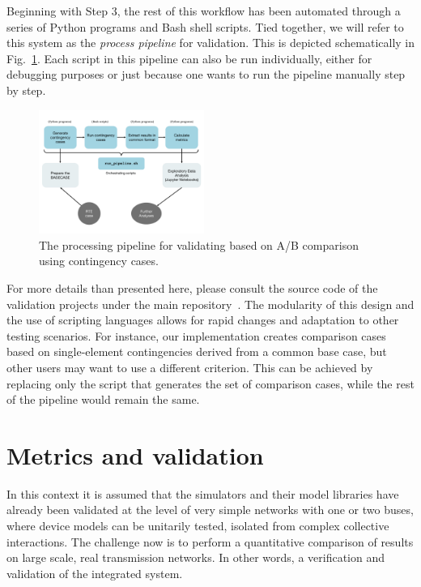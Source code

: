 \documentclass[conference]{IEEEtran}
\begin{document}
Beginning with Step 3, the rest of this workflow has been automated through a
series of Python programs and Bash shell scripts. Tied together, we will refer
to this system as the \emph{process pipeline} for validation. This is depicted
schematically in Fig.~\ref{fig:pipeline1}. Each script in this pipeline can
also be run individually, either for debugging purposes or just because one
wants to run the pipeline manually step by step.

\begin{figure}
  \centering
  \includegraphics[width=0.48\textwidth]{figs/pipeline}
  \caption{The processing pipeline for validating based on A/B comparison using
    contingency cases.}
  \label{fig:pipeline1}
\end{figure}

For more details than presented here, please consult the source code
of the validation projects under the main repository~\cite{DwoGitRepos}.
The modularity of this design and the use of scripting languages allows for
rapid changes and adaptation to other testing scenarios. For instance, our
implementation creates comparison cases based on single-element contingencies
derived from a common base case, but other users may want to use a different
criterion. This can be achieved by replacing only the script that generates the
set of comparison cases, while the rest of the pipeline would remain the same.




\section{Metrics and validation}
\label{sec:metrics}

In this context it is assumed that the simulators and their model libraries have
already been validated at the level of very simple networks with one or two
buses, where device models can be unitarily tested, isolated from complex
collective interactions.  The challenge now is to perform a quantitative
comparison of results on large scale, real transmission networks. In other
words, a verification and validation of the integrated system.
\end{document}
